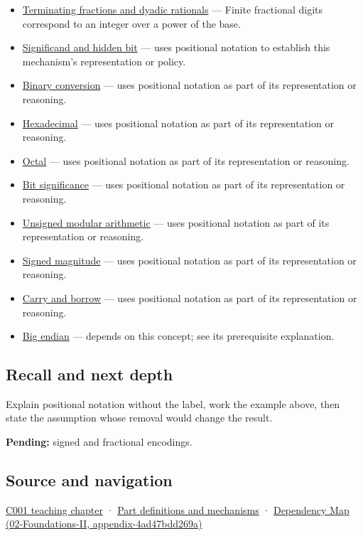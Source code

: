 \begin{itemize}
\item
  \hyperref[appendix-2a2f1b74bdd3]{Terminating fractions and dyadic rationals} --- Finite fractional digits correspond to an integer over a power of the base.
\item
  \hyperref[appendix-a24fd710cf67]{Significand and hidden bit} --- uses positional notation to establish this mechanism's representation or policy.
\item
  \hyperref[appendix-dc552784a2c0]{Binary conversion} --- uses positional notation as part of its representation or reasoning.
\item
  \hyperref[appendix-6b8075763724]{Hexadecimal} --- uses positional notation as part of its representation or reasoning.
\item
  \hyperref[appendix-17fc1bc8b305]{Octal} --- uses positional notation as part of its representation or reasoning.
\item
  \hyperref[appendix-280445746493]{Bit significance} --- uses positional notation as part of its representation or reasoning.
\item
  \hyperref[appendix-c99977d88b33]{Unsigned modular arithmetic} --- uses positional notation as part of its representation or reasoning.
\item
  \hyperref[appendix-ce20506c8532]{Signed magnitude} --- uses positional notation as part of its representation or reasoning.
\item
  \hyperref[appendix-d52d5f78ffd1]{Carry and borrow} --- uses positional notation as part of its representation or reasoning.
\item
  \hyperref[appendix-92e040df969a]{Big endian} --- depends on this concept; see its prerequisite explanation.
\end{itemize}

\subsection{Recall and next depth}\label{recall-and-next-depth}

Explain positional notation without the label, work the example above, then state the assumption whose removal would change the result.

\textbf{Pending:} signed and fractional encodings.

\subsection{Source and navigation}\label{source-and-navigation}

\href{Continuous\%20Notes/Computing\%20Foundations\%20-\%20From\%20Bits\%20to\%20C++\%20and\%20Systems\%20APIs\#From\%20a\%20signal\%20to\%20an\%20interpretation}{C001 teaching chapter} · \hyperref[appendix-fd090d982a15]{Part definitions and mechanisms} · \href{}{Dependency Map (02-Foundations-II, appendix-4ad47bdd269a)}
